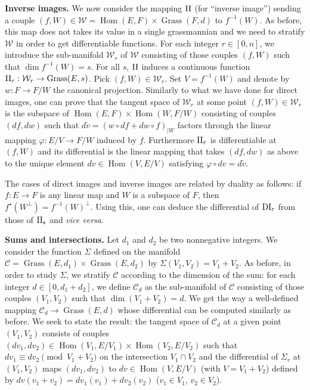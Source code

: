 \documentclass{sig-alternate}
\DeclareMathOperator{\Hom}{Hom}
\DeclareMathOperator{\Grass}{Grass}
\begin{document}
\noindent
{\bf Inverse images.}
We now consider the mapping $\text{\rm II}$ (for ``inverse image'') sending a 
couple $(f,W) \in \mathcal W = \Hom(E,F) \times \Grass(F,d)$ to 
$f^{-1}(W)$. As before, this map does not takes its value in a single 
grassmannian and we need to stratify $\mathcal W$ in order to get 
differentiable functions. For each integer $r \in [0,n]$, we introduce 
the sub-manifold $\mathcal W_r$ of $\mathcal W$ consisting of those 
couples $(f,W)$ such that $\dim f^{-1}(W) = s$. For all $s$, $\text{\rm II}$ 
induces a continuous function
$\II_r : \mathcal W_r \to \Grass(E,s)$.
Pick $(f,W) \in \mathcal W_r$. Set $V = f^{-1}(W)$ and denote by $w : F 
\to F/W$ the canonical projection.
Similarly to what we have done for direct images, one can prove that
the tangent space of $\mathcal W_r$ at some point $(f,W) \in \mathcal
W_r$ is the subspace of $\Hom(E,F) \times \Hom(W,F/W)$ consisting of 
couples $(df,dw)$ such that
$d \tilde v = (w \circ df + dw \circ f)_{|W}$
factors through the linear mapping $\varphi : E/V \to F/W$ induced by 
$f$. Furthermore $\text{\rm II}_r$ is differentiable at $(f,W)$ and its 
differential is the linear mapping that takes $(df,dw)$ as above to the 
unique element $dv \in \Hom(V,E/V)$ satisfying $\varphi \circ dv =
d\tilde v$.

The cases of direct images and inverse images are related by duality
as follows: if $f : E \to F$ is any linear map and $W$ is a subspace
of $F$, then $f^\star(W^\perp) = f^{-1}(W)^\perp$. Using this, one 
can deduce the differential of $\text{\rm DI}_r$ from those of $\text{\rm II}_s$ and 
\emph{vice versa}.


\medskip

\noindent
{\bf Sums and intersections.}
Let $d_1$ and $d_2$ be two nonnegative integers. We consider the 
function $\Sigma$ defined on the manifold $\mathcal C = \Grass(E,d_1) 
\times \Grass(E,d_2)$ by $\Sigma(V_1, V_2) = V_1 + V_2$. As before, in 
order to study $\Sigma$, we stratify $\mathcal C$ according to the 
dimension of the sum: for each integer $d \in [0, d_1+d_2]$, we define 
$\mathcal C_d$ as the sub-manifold of $\mathcal C$ consisting of those 
couples $(V_1, V_2)$ such that $\dim(V_1 + V_2) = d$. We get the way a 
well-defined mapping $\mathcal C_d \to \Grass(E,d)$ whose differential
can be computed similarly as before. We seek to state the result: the
tangent space of $\mathcal C_d$ at a given point $(V_1, V_2)$ consists 
of couples $(dv_1, dv_2) \in \Hom(V_1, E/V_1)
\times \Hom(V_2, E/V_2)$ such that $dv_1 \equiv dv_2 \pmod{V_1 + V_2}$ 
on the intersection $V_1 \cap V_2$ and the differential of $\Sigma_r$
at $(V_1, V_2)$ maps $(dv_1, dv_2)$ to $dv \in \Hom(V, E/V)$ (with $V
= V_1 + V_2$) defined by $dv(v_1 + v_2) = dv_1(v_1) + dv_2(v_2)$ ($v_1
\in V_1$, $v_2 \in V_2$).
\end{document}
